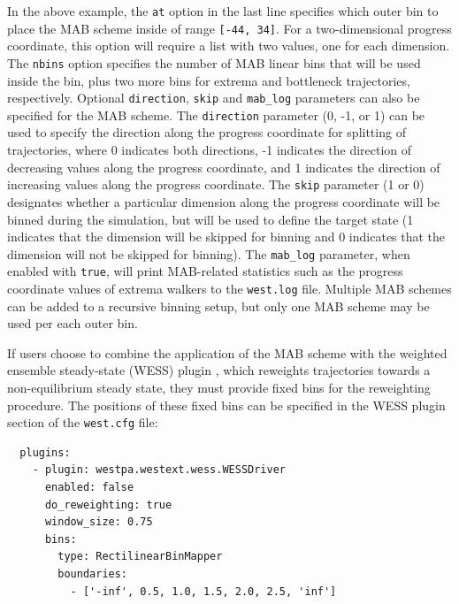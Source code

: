 In the above example, the \verb|at| option in the last line specifies which outer bin to place the MAB scheme inside of range \verb|[-44, 34]|. 
For a two-dimensional progress coordinate, this option will require a list with two values, one for each dimension. 
The \verb|nbins| option specifies the number of MAB linear bins that will be used inside the bin, plus two more bins for extrema and bottleneck trajectories, respectively. 
Optional \verb|direction|, \verb|skip| and \verb|mab_log| parameters can also be specified for the MAB scheme. 
The \verb|direction| parameter (0, -1, or 1) can be used to specify the direction along the progress coordinate for splitting of trajectories, where 0 indicates both directions, -1 indicates the direction of decreasing values along the progress coordinate, and 1 indicates the direction of increasing values along the progress coordinate. 
The \verb|skip| parameter  (1 or 0) designates whether a particular dimension along the progress coordinate will be binned during the simulation, but will be used to define the target state (1 indicates that the dimension will be skipped for binning and 0 indicates that the dimension will not be skipped for binning). 
The \verb|mab_log| parameter, when enabled with \verb|true|, will print MAB-related statistics such as the progress coordinate values of extrema walkers to the \verb|west.log| file. 
Multiple MAB schemes can be added to a recursive binning setup, but only one MAB scheme may be used per each outer bin.

If users choose to combine the application of the MAB scheme with the weighted ensemble steady-state (WESS) plugin \citep{bhatt_steady-state_2010}, which reweights trajectories towards a non-equilibrium steady state, they must provide fixed bins for the reweighting procedure. 
The positions of these fixed bins can be specified in the WESS plugin section of the \verb|west.cfg| file:

\begin{verbatim}
  plugins:
    - plugin: westpa.westext.wess.WESSDriver
      enabled: false
      do_reweighting: true
      window_size: 0.75
      bins:
        type: RectilinearBinMapper
        boundaries:
          - ['-inf', 0.5, 1.0, 1.5, 2.0, 2.5, 'inf']
          
\end{verbatim}

